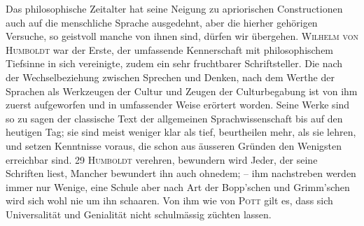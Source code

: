 \label{I.IV.humboldt}
Das philosophische Zeitalter hat seine Neigung zu apriorischen Constructionen auch auf die menschliche Sprache ausgedehnt, aber die hierher gehörigen Versuche, so geistvoll manche von ihnen sind, dürfen wir übergehen. \textsc{Wilhelm von Humboldt} war der Erste, der umfassende Kennerschaft mit philosophischem Tiefsinne in sich vereinigte, zudem ein sehr fruchtbarer Schriftsteller. Die  nach der Wechselbeziehung zwischen Sprechen und Denken, nach dem Werthe der Sprachen als Werkzeugen der Cultur und Zeugen der Culturbegabung ist von ihm zuerst aufgeworfen und in umfassender Weise erörtert worden. Seine Werke sind so zu sagen der classische Text der allgemeinen Sprachwissenschaft bis auf den heutigen Tag; sie sind  meist weniger klar als tief, beurtheilen mehr, als sie lehren, und setzen Kenntnisse voraus, die schon aus äusseren Gründen den Wenigsten erreichbar sind. 29{\textbar}{\textbar}\label{sp.29} \textsc{Humboldt} verehren, bewundern wird Jeder, der seine Schriften liest, Mancher bewundert ihn auch ohnedem; – ihm nachstreben werden immer nur Wenige, eine Schule aber nach Art der Bopp’schen und Grimm’schen wird sich wohl nie um ihn schaaren. Von ihm wie von \textsc{Pott} gilt es, dass sich Universalität und Genialität nicht schulmässig züchten lassen.

